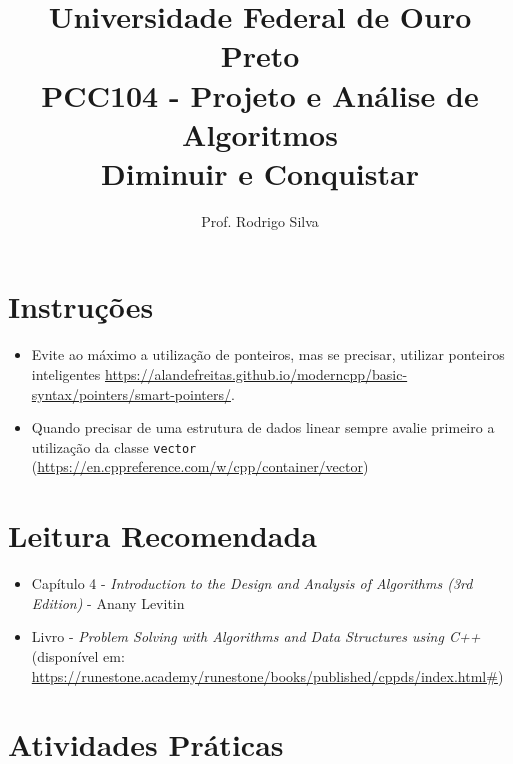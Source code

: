 \documentclass{article}
\title{\vspace{-2 cm}Universidade Federal de Ouro Preto \\ PCC104 - Projeto e Análise de Algoritmos \\ Diminuir e Conquistar}
\author{Prof. Rodrigo Silva}
\begin{document}
\maketitle

\section*{Instruções}

\begin{itemize}
    \item Evite ao máximo a utilização de ponteiros, mas se precisar, utilizar ponteiros inteligentes \url{https://alandefreitas.github.io/moderncpp/basic-syntax/pointers/smart-pointers/}. 
    \item Quando precisar de uma estrutura de dados linear sempre avalie primeiro a utilização da classe \texttt{vector} (\url{https://en.cppreference.com/w/cpp/container/vector})
\end{itemize}

\section{Leitura Recomendada}

\begin{itemize}
    \item Capítulo 4 - \textit{Introduction to the Design and Analysis of Algorithms (3rd Edition)} - Anany Levitin 
    \item Livro - \textit{Problem Solving with Algorithms and Data Structures using C++} (disponível em: \url{https://runestone.academy/runestone/books/published/cppds/index.html#})
\end{itemize}

\section{Atividades Práticas}
\end{document}
